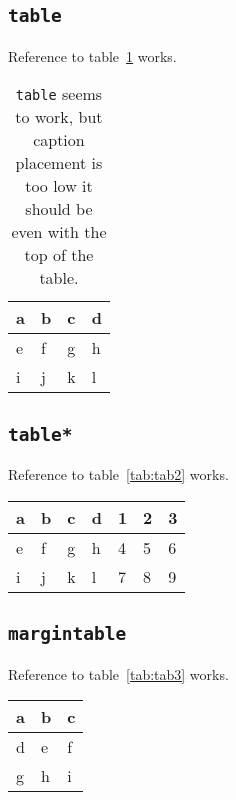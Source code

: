 \documentclass{article}
\begin{document}
\subsection{\texttt{table}}
Reference to table~\ref{tab:tab1} works.
\begin{table}[h]
\begin{center}
\begin{tabular}{llll}
\toprule
a & b & c & d \\
\midrule
e & f & g & h \\
i & j & k & l \\
\bottomrule
\end{tabular}
\end{center}
\caption{\texttt{table} seems to work, but caption placement is too low it should be even with the top of the table.}
\label{tab:tab1}
\end{table}

\subsection{\texttt{table*}}
Reference to table~\ref{tab:tab2} works.
\begin{table*}[h]
\begin{center}
\begin{tabular}{lllllll}
\toprule
a & b & c & d & 1 & 2 & 3\\
\midrule
e & f & g & h & 4 & 5 & 6\\
i & j & k & l & 7 & 8 & 9\\
\bottomrule
\end{tabular}
\end{center}
\caption{\texttt{table*} also seems to work?}
\label{tab:tab2}
\end{table*}

\subsection{\texttt{margintable}}
Reference to table~\ref{tab:tab3} works.
\begin{margintable}
\begin{center}
\begin{tabular}{lll}
\toprule
a & b & c \\
\midrule
d & e & f \\
g & h & i \\
\bottomrule
\end{tabular}
\end{center}
\caption{\texttt{margintable} here, seems to work right.}
\label{tab:tab3}
\end{margintable}
\end{document}
